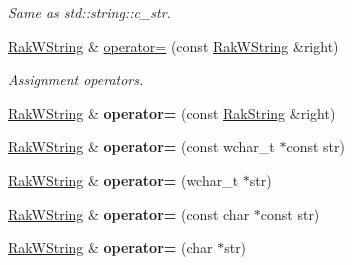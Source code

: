 \begin{DoxyCompactItemize}
\begin{DoxyCompactList}\small\item\em Same as std\-::string\-::c\-\_\-str. \end{DoxyCompactList}\item 
\hypertarget{class_rak_net_1_1_rak_w_string_ab8ad53a1d7e52079b13def2735521f68}{\hyperlink{class_rak_net_1_1_rak_w_string}{Rak\-W\-String} \& \hyperlink{class_rak_net_1_1_rak_w_string_ab8ad53a1d7e52079b13def2735521f68}{operator=} (const \hyperlink{class_rak_net_1_1_rak_w_string}{Rak\-W\-String} \&right)}\label{class_rak_net_1_1_rak_w_string_ab8ad53a1d7e52079b13def2735521f68}

\begin{DoxyCompactList}\small\item\em Assignment operators. \end{DoxyCompactList}\item 
\hypertarget{class_rak_net_1_1_rak_w_string_a25a5fca6875f02efcb1b976a4013e562}{\hyperlink{class_rak_net_1_1_rak_w_string}{Rak\-W\-String} \& {\bfseries operator=} (const \hyperlink{class_rak_net_1_1_rak_string}{Rak\-String} \&right)}\label{class_rak_net_1_1_rak_w_string_a25a5fca6875f02efcb1b976a4013e562}

\item 
\hypertarget{class_rak_net_1_1_rak_w_string_a184542af1dfe7cb6ba0991f050f4c83e}{\hyperlink{class_rak_net_1_1_rak_w_string}{Rak\-W\-String} \& {\bfseries operator=} (const wchar\-\_\-t $\ast$const str)}\label{class_rak_net_1_1_rak_w_string_a184542af1dfe7cb6ba0991f050f4c83e}

\item 
\hypertarget{class_rak_net_1_1_rak_w_string_a1d3428e4f2ef70a3d94a1c2ccc74ebe4}{\hyperlink{class_rak_net_1_1_rak_w_string}{Rak\-W\-String} \& {\bfseries operator=} (wchar\-\_\-t $\ast$str)}\label{class_rak_net_1_1_rak_w_string_a1d3428e4f2ef70a3d94a1c2ccc74ebe4}

\item 
\hypertarget{class_rak_net_1_1_rak_w_string_a9cad1b4791736a6093730e65076b1551}{\hyperlink{class_rak_net_1_1_rak_w_string}{Rak\-W\-String} \& {\bfseries operator=} (const char $\ast$const str)}\label{class_rak_net_1_1_rak_w_string_a9cad1b4791736a6093730e65076b1551}

\item 
\hypertarget{class_rak_net_1_1_rak_w_string_a20c621c313806cdd0e9d74edb246e0ea}{\hyperlink{class_rak_net_1_1_rak_w_string}{Rak\-W\-String} \& {\bfseries operator=} (char $\ast$str)}\label{class_rak_net_1_1_rak_w_string_a20c621c313806cdd0e9d74edb246e0ea}


\end{DoxyCompactItemize}
